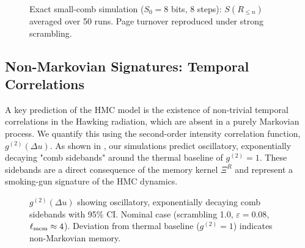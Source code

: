 \documentclass[11pt,a4paper]{article}
\newcommand{\HMC}{\textsc{HMC}\xspace}
\theoremstyle{plain}
\theoremstyle{definition}
\theoremstyle{remark}
\begin{document}
\begin{figure}[htbp]
    \centering
  \caption{Exact small-comb simulation ($S_0=8$ bits, 8 steps): $S(R_{\le n})$ averaged over 50 runs. Page turnover reproduced under strong scrambling.}
    \label{fig:page_curve_exact}
\end{figure}

\subsection{Non-Markovian Signatures: Temporal Correlations}
A key prediction of the \HMC{} model is the existence of non-trivial temporal correlations in the Hawking radiation, which are absent in a purely Markovian process. We quantify this using the second-order intensity correlation function, $g^{(2)}(\Delta u)$. As shown in , our simulations predict oscillatory, exponentially decaying "comb sidebands" around the thermal baseline of $g^{(2)}=1$. These sidebands are a direct consequence of the memory kernel $\Xi^R$ and represent a smoking-gun signature of the \HMC{} dynamics.

\begin{figure}[htbp]
\centering
{}
\caption{$g^{(2)}(\Delta u)$ showing oscillatory, exponentially decaying comb sidebands with 95\% CI. Nominal case (scrambling 1.0, $\varepsilon=0.08$, $\ell_{\rm mem} \approx 4$). Deviation from thermal baseline ($g^{(2)}=1$) indicates non-Markovian memory.}
\label{fig:g2}
\end{figure}
\end{document}
